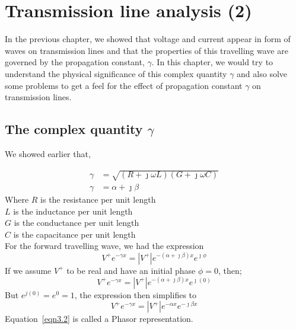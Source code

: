 \chapter{Transmission line analysis (2)}\label{lec:lec3}
In the previous chapter, we showed that voltage and current appear in form of waves on transmission lines and that the properties of this travelling wave are governed by the propagation constant, $\gamma$. In this chapter, we would try to understand the physical significance of this complex quantity $\gamma$ and also solve some problems to get a feel for the effect of propagation constant $\gamma$ on transmission lines.


\section{The complex quantity $\gamma$}We showed earlier that,

\begin{align*}
\gamma &= \sqrt{(R + \jmath\omega L)(G + \jmath\omega C)} \\
\gamma & = \alpha + \jmath\beta
\end{align*}
Where $R$ is the resistance per unit length\\

\hspace{13pt}$L$ is the inductance per unit length\\

\hspace{13pt}$G$ is the conductance per unit length\\ 

\hspace{13pt}$C$ is the capacitance per unit length\\
For the forward travelling wave, we had the expression
\begin{equation}
V^+e^{-\gamma x} =\left|  V^+\right| e^{-(\alpha + \jmath\beta)x}e^{\jmath\phi}
\end{equation}
If we assume $V^+$ to be real and have an initial phase $\phi = 0$, then;
\begin{equation*}
V^+e^{-\gamma x} = \left| V^+\right| e^{-(\alpha + \jmath\beta)x}e^{\jmath (0)}
\end{equation*}
But $ e^{j(0)} = e^0 = 1 $, the expression then simplifies to
\begin{equation}
V^+e^{-\gamma x} = \left| V^+\right| e^{-\alpha x}e^{-\jmath\beta x}
\label{eqn3.2}
\end{equation}
Equation~\ref{eqn3.2} is called a Phasor representation.\\

